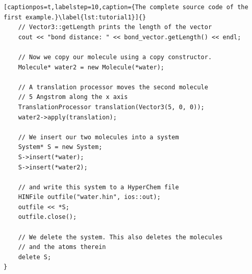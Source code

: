 \begin{lstlisting}[captionpos=t,labelstep=10,caption={The complete source code of the first example.}\label{lst:tutorial1}]{}
	// Vector3::getLength prints the length of the vector
	cout << "bond distance: " << bond_vector.getLength() << endl;

	// Now we copy our molecule using a copy constructor.
	Molecule* water2 = new Molecule(*water);

	// A translation processor moves the second molecule
	// 5 Angstrom along the x axis
	TranslationProcessor translation(Vector3(5, 0, 0));
	water2->apply(translation);

	// We insert our two molecules into a system
	System* S = new System;
	S->insert(*water);
	S->insert(*water2);

	// and write this system to a HyperChem file
	HINFile outfile("water.hin", ios::out);
	outfile << *S;
	outfile.close();

	// We delete the system. This also deletes the molecules
	// and the atoms therein
	delete S;
}
\end{lstlisting}
